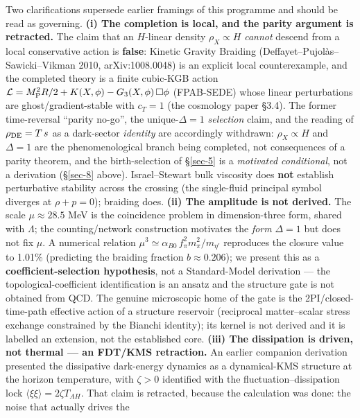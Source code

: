 \documentclass[aps,prd,preprint,nofootinbib,superscriptaddress]{revtex4-2}
\begin{document}
Two clarifications supersede earlier framings of this programme and
should be read as governing. \textbf{(i) The completion is local, and
the parity argument is retracted.} The claim that an \(H\)-linear
density \(\rho_X \propto H\) \emph{cannot} descend from a local
conservative action is \textbf{false}: Kinetic Gravity Braiding
(Deffayet--Pujolàs--Sawicki--Vikman 2010, arXiv:1008.0048) is an
explicit local counterexample, and the completed theory is a finite
cubic-KGB action
\(\mathcal{L} = M_{\rm P}^2 R/2 + K(X,\phi) - G_3(X,\phi)\,\Box\phi\)
(FPAB-SEDE) whose linear perturbations are ghost/gradient-stable with
\(c_T = 1\) (the cosmology paper §3.4). The former time-reversal
``parity no-go'', the unique-\(\Delta=1\) \emph{selection} claim, and
the reading of \(\rho_{\rm DE} = T\,s\) as a dark-sector \emph{identity}
are accordingly withdrawn: \(\rho_X \propto H\) and \(\Delta = 1\) are
the phenomenological branch being completed, not consequences of a
parity theorem, and the birth-selection of §\ref{sec-5} is a
\emph{motivated conditional}, not a derivation (§\ref{sec-8} above).
Israel--Stewart bulk viscosity does \textbf{not} establish perturbative
stability across the crossing (the single-fluid principal symbol
diverges at \(\rho+p=0\)); braiding does. \textbf{(ii) The amplitude is
not derived.} The scale \(\mu \approx 28.5\) MeV is the coincidence
problem in dimension-three form, shared with \(\Lambda\); the
counting/network construction motivates the \emph{form} \(\Delta=1\) but
does not fix \(\mu\). A numerical relation
\(\mu^3 \simeq \alpha_{B0}\,f_\pi^2 m_\pi^2/m_{\eta'}\) reproduces the
closure value to 1.01\% (predicting the braiding fraction
\(b \approx 0.206\)); we present this as a \textbf{coefficient-selection
hypothesis}, not a Standard-Model derivation --- the
topological-coefficient identification is an ansatz and the structure
gate is not obtained from QCD. The genuine microscopic home of the gate
is the 2PI/closed-time-path effective action of a structure reservoir
(reciprocal matter--scalar stress exchange constrained by the Bianchi
identity); its kernel is not derived and it is labelled an extension,
not the established core. \textbf{(iii) The dissipation is driven, not
thermal --- an FDT/KMS retraction.} An earlier companion derivation
presented the dissipative dark-energy dynamics as a dynamical-KMS
structure at the horizon temperature, with \(\zeta > 0\) identified with
the fluctuation--dissipation lock
\(\langle\xi\xi\rangle = 2\zeta T_{AH}\). That claim is retracted,
because the calculation was done: the noise that actually drives the
\end{document}
